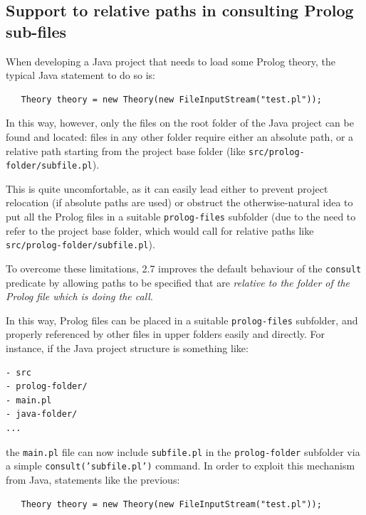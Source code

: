 \subsection{Support to relative paths in consulting Prolog sub-files}
\label{ssec:relative-paths-consulting-subfiles-in-java-project}

When developing a Java project that needs to load some Prolog theory, the typical Java statement to do so is:

\begin{verbatim}
   Theory theory = new Theory(new FileInputStream("test.pl"));
\end{verbatim}

\noindent In this way, however, only the files on the root folder of the Java project can be found and located: files in any other folder require either an absolute path, or a relative path starting from the project base folder (like \texttt{src/prolog-folder/subfile.pl}).

This is quite uncomfortable, as it can easily lead either to prevent project relocation (if absolute paths are used) or  obstruct the otherwise-natural idea to put all the Prolog files in a suitable \texttt{prolog-files} subfolder (due to the need to refer to the project base folder, which would call for relative paths like \texttt{src/prolog-folder/subfile.pl}).

To overcome these limitations, \tuprolog{} 2.7 improves the default behaviour of the \texttt{consult} predicate by allowing
paths to be specified that are \textit{relative to the folder of the Prolog file which is doing the call}.

In this way, Prolog files can be placed in a suitable \texttt{prolog-files} subfolder, and properly referenced by other files in upper folders easily and directly. For instance, if the Java project structure is something like:

\begin{verbatim}
- src
- prolog-folder/
- main.pl
- java-folder/
...
\end{verbatim}

\noindent the \texttt{main.pl} file can now include \texttt{subfile.pl} in the \texttt{prolog-folder} subfolder via a simple \texttt{consult('subfile.pl')} command.
%
In order to exploit this mechanism from Java, statements like the previous:

\begin{verbatim}
   Theory theory = new Theory(new FileInputStream("test.pl"));
\end{verbatim}

